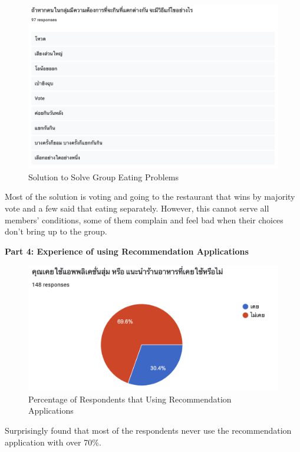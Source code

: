 \documentclass[12pt,oneside,openright,a4paper]{cpe-english-project}
\begin{document}
\begin{figure}[H]\centering
\includegraphics[width=350pt]{./images/A1SolutiontoSolveGroupEatingProblems.png}
\caption{Solution to Solve Group Eating Problems}\label{fig:A1SolutiontoSolveGroupEatingProblems}
\end{figure}

Most of the solution is voting and going to the restaurant that wins by majority vote and a few said that eating separately. However, this cannot serve all members' conditions, some of them complain and feel bad when their choices don't bring up to the group.

\newpage
\textbf{Part 4: Experience of using Recommendation Applications}

\begin{figure}[H]\centering
\includegraphics[width=350pt]{./images/A1PercentageofRespondentsthatUsingRecommendationApplications.png}
\caption{Percentage of Respondents that Using Recommendation Applications}\label{fig:A1PercentageofRespondentsthatUsingRecommendationApplications}
\end{figure}

Surprisingly found that most of the respondents never use the recommendation application with over 70\%.
\end{document}
